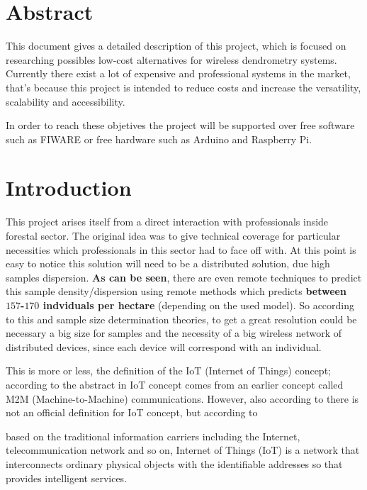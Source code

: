 \documentclass[11pt,a4paper,dvipsnames,twoside]{article}
\newcommand{\doubt}[1] {\textbf{\color{Red3}#1}}
\newcommand{\lang}[1] {\textbf{\color{Tomato1}#1}}
\begin{document}
\newpage

\section*{Abstract}
%
This document gives a detailed description of this project, which is focused on researching possibles low-cost alternatives for wireless dendrometry systems. Currently there exist a lot of expensive and professional systems in the market, that's because this project is intended to reduce costs and increase the versatility, scalability and accessibility.

In order to reach these objetives the project will be supported over free software such as FIWARE\cite{Fiware} or free hardware such as Arduino\cite{Arduino} and Raspberry Pi\cite{Raspberrypi}.

\section{Introduction}
This project arises itself from a direct interaction with professionals inside forestal sector. The original idea was to give technical coverage for particular necessities which professionals in this sector had to face off with. At this point is easy to notice this solution will need to be a distributed solution, due high samples dispersion. \lang{As can be seen}, there are even remote techniques to predict this sample density/dispersion using remote methods which predicts \doubt{between $157$-$170$ indviduals per hectare}\cite{ForestStandVol} (depending on the used model). So according to this and sample size determination theories, to get a great resolution could be necessary a big size for samples and the necessity of a big wireless network of distributed devices, since each device will correspond with an individual.

This is more or less, the definition of the IoT (Internet of Things) concept; according to the abstract in \cite{IoTOverview} IoT concept comes from an earlier concept called M2M (Machine-to-Machine) communications. However, also according to \cite[p.~1(71)]{IoTOverview} there is not an official definition for IoT concept, but according to \cite[p.~2(920)]{IoTObjetives}

\begin{quoting}
  based on the traditional information carriers including the Internet, telecommunication  network  and  so  on,  Internet  of Things (IoT) is a network that interconnects ordinary physical  objects  with  the identifiable addresses  so that provides intelligent services.
\end{quoting}
\end{document}
